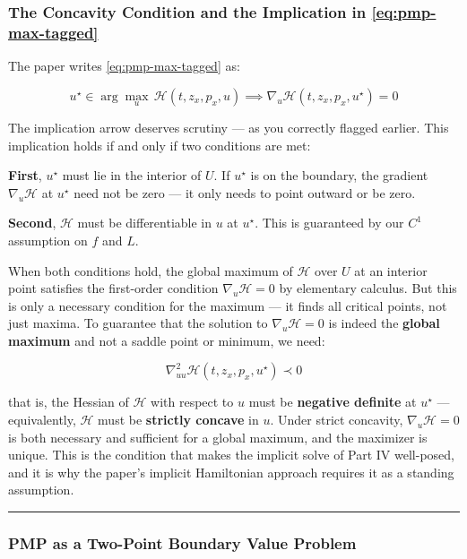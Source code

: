 \documentclass{article}
\begin{document}
\subsubsection{The Concavity Condition and the Implication in \eqref{eq:pmp-max-tagged}}

\begin{mathrequirementsbox}
The paper writes \eqref{eq:pmp-max-tagged} as:

$$u^\star \in \arg\max_u\, \mathcal{H}(t, z_x, p_x, u) \implies \nabla_u \mathcal{H}(t, z_x, p_x, u^\star) = 0$$

The implication arrow deserves scrutiny — as you correctly flagged earlier. This implication holds if and only if two conditions are met:

\textbf{First}, $u^\star$ must lie in the interior of $U$. If $u^\star$ is on the boundary, the gradient $\nabla_u \mathcal{H}$ at $u^\star$ need not be zero — it only needs to point outward or be zero.

\textbf{Second}, $\mathcal{H}$ must be differentiable in $u$ at $u^\star$. This is guaranteed by our $C^1$ assumption on $f$ and $L$.

When both conditions hold, the global maximum of $\mathcal{H}$ over $U$ at an interior point satisfies the first-order condition $\nabla_u \mathcal{H} = 0$ by elementary calculus. But this is only a necessary condition for the maximum — it finds all critical points, not just maxima. To guarantee that the solution to $\nabla_u \mathcal{H} = 0$ is indeed the \textbf{global maximum} and not a saddle point or minimum, we need:

$$\nabla^2_{uu} \mathcal{H}(t, z_x, p_x, u^\star) \prec 0$$

that is, the Hessian of $\mathcal{H}$ with respect to $u$ must be \textbf{negative definite} at $u^\star$ — equivalently, $\mathcal{H}$ must be \textbf{strictly concave} in $u$. Under strict concavity, $\nabla_u \mathcal{H} = 0$ is both necessary and sufficient for a global maximum, and the maximizer is unique. This is the condition that makes the implicit solve of Part IV well-posed, and it is why the paper's implicit Hamiltonian approach requires it as a standing assumption.
\end{mathrequirementsbox}

\medskip\hrule\medskip

\subsubsection{PMP as a Two-Point Boundary Value Problem}
\end{document}
